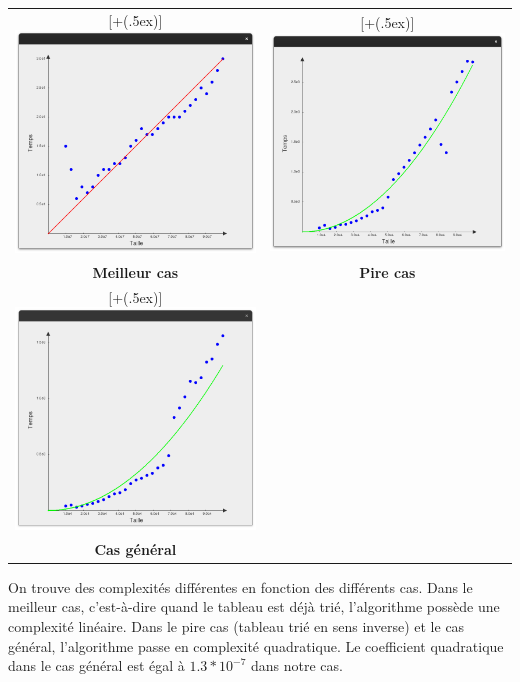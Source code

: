 \documentclass[12pt]{article}
\newcommand*{\addheight}[2][.5ex]{%
  \raisebox{0pt}[\dimexpr\height+(#1)\relax]{#2}%
}
\begin{document}
\begin{tabular}[H]{c c}
    \addheight{\includegraphics[width=18em]{ins_meilleur.png}} &
    \addheight{\includegraphics[width=18em]{ins_pire.png}} \\
    \small \textbf{Meilleur cas} & \textbf{Pire cas} \\
    \addheight{\includegraphics[width=18em]{ins_gen.png}}  & \\
    \small \textbf{Cas général} & \\
\end{tabular}


On trouve des complexités différentes en fonction des différents cas. Dans le meilleur cas, c'est-à-dire quand le tableau est déjà trié, l'algorithme possède une complexité linéaire. Dans le pire cas (tableau trié en sens inverse) et le cas général, l'algorithme passe en complexité quadratique. Le coefficient quadratique dans le cas général est égal à $1.3*10^{-7}$ dans notre cas.
\end{document}
